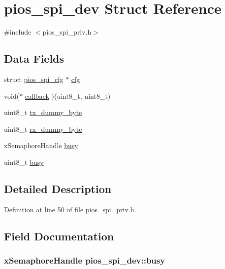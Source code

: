 \hypertarget{structpios__spi__dev}{\section{pios\-\_\-spi\-\_\-dev \-Struct \-Reference}
\label{structpios__spi__dev}
}


{\ttfamily \#include $<$pios\-\_\-spi\-\_\-priv.\-h$>$}

\subsection*{\-Data \-Fields}
\begin{DoxyCompactItemize}
\item 
struct \hyperlink{structpios__spi__cfg}{pios\-\_\-spi\-\_\-cfg} $\ast$ \hyperlink{structpios__spi__dev_afcd7e74a6f561b546a7b828466a12f94}{cfg}
\item 
void($\ast$ \hyperlink{structpios__spi__dev_a15f1ecafedc8c12d37bf9bf066b993c6}{callback} )(uint8\-\_\-t, uint8\-\_\-t)
\item 
uint8\-\_\-t \hyperlink{structpios__spi__dev_a72b66190a7211a66c58fdc359c742438}{tx\-\_\-dummy\-\_\-byte}
\item 
uint8\-\_\-t \hyperlink{structpios__spi__dev_a003d648a4e5f69fab071c4ed53059418}{rx\-\_\-dummy\-\_\-byte}
\item 
x\-Semaphore\-Handle \hyperlink{structpios__spi__dev_a3fcabfcfba2df1b74edfeacd5b0f4a5e}{busy}
\item 
uint8\-\_\-t \hyperlink{structpios__spi__dev_a90778ce216b2c078f3c6dade52f3f2be}{busy}
\end{DoxyCompactItemize}


\subsection{\-Detailed \-Description}


\-Definition at line 50 of file pios\-\_\-spi\-\_\-priv.\-h.



\subsection{\-Field \-Documentation}
\hypertarget{structpios__spi__dev_a3fcabfcfba2df1b74edfeacd5b0f4a5e}{
\subsubsection[{busy}]{\setlength{\rightskip}{0pt plus 5cm}x\-Semaphore\-Handle {\bf pios\-\_\-spi\-\_\-dev\-::busy}}}\label{structpios__spi__dev_a3fcabfcfba2df1b74edfeacd5b0f4a5e}


